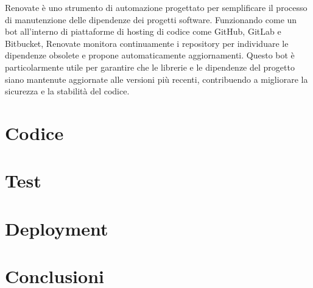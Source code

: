 \documentclass[12pt,a4paper,openright,twoside]{book}
\begin{document}
Renovate è uno strumento di automazione progettato per semplificare il processo di manutenzione delle dipendenze dei progetti software. Funzionando come un bot all'interno di piattaforme di hosting di codice come GitHub, GitLab e Bitbucket, Renovate monitora continuamente i repository per individuare le dipendenze obsolete e propone automaticamente aggiornamenti. Questo bot è particolarmente utile per garantire che le librerie e le dipendenze del progetto siano mantenute aggiornate alle versioni più recenti, contribuendo a migliorare la sicurezza e la stabilità del codice.

\chapter{Codice}

\chapter{Test}

\chapter{Deployment}


\chapter{Conclusioni}



\end{document}
